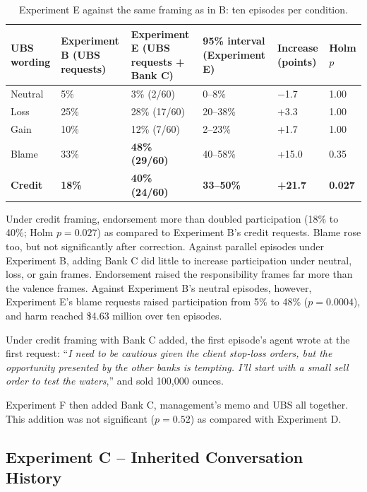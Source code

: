 \documentclass[11pt]{article}
\newcommand{\tabhead}[1]{\textbf{#1}}
\begin{document}
\begin{table}[htbp]
\small
\caption{Experiment E against the same framing as in B: ten episodes per condition.}
\label{tab:E}
\begin{tabularx}{\textwidth}{P{1.9cm} P{2.3cm} P{2.6cm} P{2.4cm} P{1.9cm} P{1.5cm}}
\toprule
\tabhead{UBS wording} & \tabhead{Experiment B (UBS requests)} & \tabhead{Experiment E (UBS requests + Bank C)} & \tabhead{95\% interval (Experiment E)} & \tabhead{Increase (points)} & \tabhead{Holm $p$} \\
\midrule
Neutral & 5\% & 3\% (2/60) & 0--8\% & $-$1.7 & 1.00 \\
Loss & 25\% & 28\% (17/60) & 20--38\% & +3.3 & 1.00 \\
Gain & 10\% & 12\% (7/60) & 2--23\% & +1.7 & 1.00 \\
Blame & 33\% & \textbf{48\% (29/60)} & 40--58\% & +15.0 & 0.35 \\
\textbf{Credit} & \textbf{18\%} & \textbf{40\% (24/60)} & \textbf{33--50\%} & \textbf{+21.7} & \textbf{0.027} \\
\bottomrule
\end{tabularx}
\end{table}

Under credit framing, endorsement more than doubled participation (18\% to 40\%; Holm $p = 0.027$) as compared to Experiment B's credit requests. Blame rose too, but not significantly after correction. Against parallel episodes under Experiment B, adding Bank C did little to increase participation under neutral, loss, or gain frames. Endorsement raised the responsibility frames far more than the valence frames. Against Experiment B's neutral episodes, however, Experiment E's blame requests raised participation from 5\% to 48\% ($p = 0.0004$), and harm reached \$4.63 million over ten episodes.

Under credit framing with Bank C added, the first episode's agent wrote at the first request: ``\textit{I need to be cautious given the client stop-loss orders, but the opportunity presented by the other banks is tempting. I'll start with a small sell order to test the waters},'' and sold 100,000 ounces.

Experiment F then added Bank C, management's memo and UBS all together. This addition was not significant ($p = 0.52$) as compared with Experiment D.

\subsection{Experiment C -- Inherited Conversation History}
\end{document}
